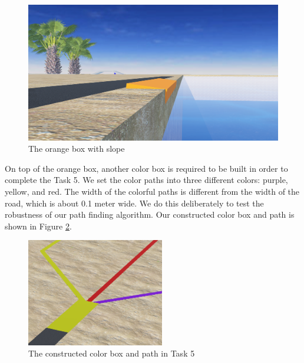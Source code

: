 \begin{figure}[htbp]
    \centering
    \includegraphics[width=12cm]{implementation/img_chu/orange_box.png}
    \caption{The orange box with slope}
    \label{fig:orange_box}
\end{figure}

On top of the orange box, another color box is required to be built in order to complete the Task 5. We set the color paths into three different colors: purple, yellow, and red. The width of the colorful paths is different from the width of the road, which is about 0.1 meter wide. We do this deliberately to test the robustness of our path finding algorithm. Our constructed color box and path is shown in Figure \ref{fig:color_box}.

\begin{figure}[htbp]
    \centering
    \includegraphics[width=6cm]{implementation/img_chu/color_box.png}
    \caption{The constructed color box and path in Task 5}
    \label{fig:color_box}
\end{figure}

